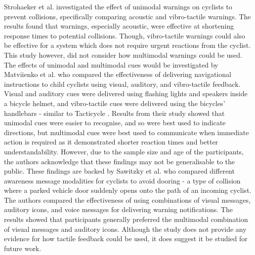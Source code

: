 \documentclass{interim}
\begin{document}
Strohaeker et al. \cite{STROHAEKER2022151} investigated the effect of unimodal warnings on cyclists to prevent collisions, specifically comparing acoustic and vibro-tactile warnings. The results found that warnings, especially acoustic, were effective at shortening response times to potential collisions. Though, vibro-tactile warnings could also be effective for a system which does not require urgent reactions from the cyclist. This study however, did not consider how multimodal warnings could be used. The effects of unimodal and multimodal cues would be investigated by Matviienko et al. \cite{10.1145/3290605.3300850, 10.1145/3229434.3229479} who compared the effectiveness of delivering navigational instructions to child cyclists using visual, auditory, and vibro-tactile feedback. Visual and auditory cues were delivered using flashing lights and speakers inside a bicycle helmet, and vibro-tactile cues were delivered using the bicycles' handlebars - similar to Tacticycle \cite{10.1145/2371574.2371631}. Results from their study showed that unimodal cues were easier to recognise, and so were best used to indicate directions, but multimodal cues were best used to communicate when immediate action is required as it demonstrated shorter reaction times and better understandability. However, due to the sample size and age of the participants, the authors acknowledge that these findings may not be generalisable to the public. These findings are backed by Sawitzky et al. \cite{10.1145/3490099.3511127, mti6010003} who compared different awareness message modalities for cyclists to avoid dooring - a type of collision where a parked vehicle door suddenly opens onto the path of an incoming cyclist. The authors compared the effectiveness of using combinations of visual messages, auditory icons, and voice messages for delivering warning notifications. The results showed that participants generally preferred the multimodal combination of visual messages and auditory icons. Although the study does not provide any evidence for how tactile feedback could be used, it does suggest it be studied for future work.
\end{document}
